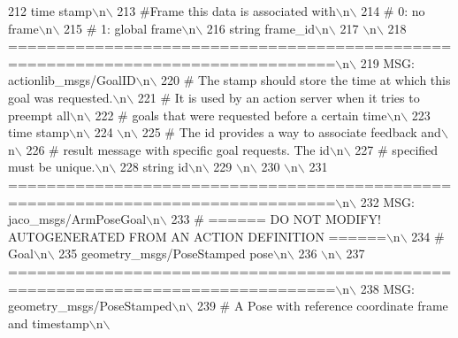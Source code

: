 \begin{DoxyCode}
212 \textcolor{stringliteral}{time stamp\(\backslash\)n\(\backslash\)}
213 \textcolor{stringliteral}{#Frame this data is associated with\(\backslash\)n\(\backslash\)}
214 \textcolor{stringliteral}{# 0: no frame\(\backslash\)n\(\backslash\)}
215 \textcolor{stringliteral}{# 1: global frame\(\backslash\)n\(\backslash\)}
216 \textcolor{stringliteral}{string frame\_id\(\backslash\)n\(\backslash\)}
217 \textcolor{stringliteral}{\(\backslash\)n\(\backslash\)}
218 \textcolor{stringliteral}{================================================================================\(\backslash\)n\(\backslash\)}
219 \textcolor{stringliteral}{MSG: actionlib\_msgs/GoalID\(\backslash\)n\(\backslash\)}
220 \textcolor{stringliteral}{# The stamp should store the time at which this goal was requested.\(\backslash\)n\(\backslash\)}
221 \textcolor{stringliteral}{# It is used by an action server when it tries to preempt all\(\backslash\)n\(\backslash\)}
222 \textcolor{stringliteral}{# goals that were requested before a certain time\(\backslash\)n\(\backslash\)}
223 \textcolor{stringliteral}{time stamp\(\backslash\)n\(\backslash\)}
224 \textcolor{stringliteral}{\(\backslash\)n\(\backslash\)}
225 \textcolor{stringliteral}{# The id provides a way to associate feedback and\(\backslash\)n\(\backslash\)}
226 \textcolor{stringliteral}{# result message with specific goal requests. The id\(\backslash\)n\(\backslash\)}
227 \textcolor{stringliteral}{# specified must be unique.\(\backslash\)n\(\backslash\)}
228 \textcolor{stringliteral}{string id\(\backslash\)n\(\backslash\)}
229 \textcolor{stringliteral}{\(\backslash\)n\(\backslash\)}
230 \textcolor{stringliteral}{\(\backslash\)n\(\backslash\)}
231 \textcolor{stringliteral}{================================================================================\(\backslash\)n\(\backslash\)}
232 \textcolor{stringliteral}{MSG: jaco\_msgs/ArmPoseGoal\(\backslash\)n\(\backslash\)}
233 \textcolor{stringliteral}{# ====== DO NOT MODIFY! AUTOGENERATED FROM AN ACTION DEFINITION ======\(\backslash\)n\(\backslash\)}
234 \textcolor{stringliteral}{# Goal\(\backslash\)n\(\backslash\)}
235 \textcolor{stringliteral}{geometry\_msgs/PoseStamped pose\(\backslash\)n\(\backslash\)}
236 \textcolor{stringliteral}{\(\backslash\)n\(\backslash\)}
237 \textcolor{stringliteral}{================================================================================\(\backslash\)n\(\backslash\)}
238 \textcolor{stringliteral}{MSG: geometry\_msgs/PoseStamped\(\backslash\)n\(\backslash\)}
239 \textcolor{stringliteral}{# A Pose with reference coordinate frame and timestamp\(\backslash\)n\(\backslash\)}

\end{DoxyCode}
